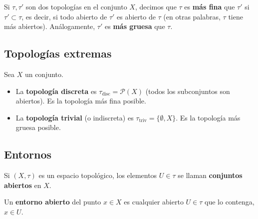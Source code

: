 

\begin{definición}
    Si $\tau, \tau'$ son dos topologías en el conjunto $X$, decimos que $\tau$ es \textbf{más fina} que $\tau'$ si $\tau' \subset \tau$, es decir, si todo abierto de $\tau'$ es abierto de $\tau$ (en otras palabras, $\tau$ tiene más abiertos). Análogamente, $\tau'$ es \textbf{más gruesa} que $\tau$.
\end{definición}

\subsection{Topologías extremas}

\begin{definición}
    Sea $X$ un conjunto.
    \begin{itemize}
        \item La \textbf{topología discreta} es $\tau_{\text{disc}} = \mathcal{P}(X)$ (todos los subconjuntos son abiertos). Es la topología más fina posible.
        \item La \textbf{topología trivial} (o indiscreta) es $\tau_{\text{triv}} = \{\emptyset, X\}$. Es la topología más gruesa posible.
    \end{itemize}
\end{definición}


\subsection{Entornos}

Si $(X, \tau)$ es un espacio topológico, los elementos $U \in \tau$ se llaman \textbf{conjuntos abiertos} en $X$.

\begin{definición}
    Un \textbf{entorno abierto} del punto $x \in X$ es cualquier abierto $U \in \tau$ que lo contenga, $x \in U$.
\end{definición}

